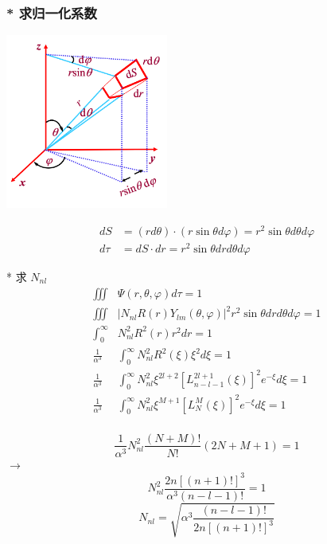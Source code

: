 \begin{frame}
	\frametitle{* 求归一化系数}
  \begin{center}
	   \includegraphics[width=0.4\textwidth]{figs/dt.png}
  \end{center}
$$ \begin{aligned}
  dS&=(rd\theta)\cdot (r\sin \theta d \varphi ) =r^2 \sin \theta d\theta d \varphi \\
  d \tau &=dS \cdot dr = r^2 \sin \theta dr d\theta d \varphi	  
\end{aligned}$$
\end{frame}

\begin{frame}
	* 求 $N_{nl}$ 
	\begin{equation*}
	\begin{split}
		\iiint  &\Psi(r,\theta,\varphi) d \tau =1  \\
		\iiint  &|N_{nl} R (r) Y_{lm} (\theta,\varphi)| ^2 r^2 \sin \theta dr d\theta d\varphi =1  \\
		\int_{0}^{\infty}  & N^2_{nl} R^2  (r)  r^2 dr =1   \\
		\frac{1}{\alpha ^3}	&\int_{0}^{\infty}  N^2_{nl}  R^2 (\xi)  \xi^2 d\xi =1   \\
		\frac{1}{\alpha ^3} &	\int_{0}^{\infty}  N^2_{nl}  \xi ^{2l+2}  [L_{n-l-1} ^{2l+1} (\xi)]^2 e^{-\xi}  d\xi =1   \\
		\frac{1}{\alpha ^3} &	\int_{0}^{\infty}  N^2_{nl}  \xi ^{M+1}  [L_N ^M (\xi)]^2 e^{-\xi}  d\xi =1   \\
	\end{split}		
	\end{equation*}	
\end{frame}		

\begin{frame}
	\begin{equation*}
		\frac{1}{\alpha ^3} 	  N^2_{nl}  \frac{(N+M)!}{N!} (2N+M+1) =1  	
	\end{equation*}	
	$\to$ \\
	\begin{equation*}
		N^2 _{nl}  \frac{2n [(n+1)!]^3} {\alpha^3 (n-l-1)!} =1
	\end{equation*}	
	\begin{equation*}
		N_{nl}  =\sqrt{\alpha^3 \frac{ (n-l-1)!}{2n [(n+1)!]^3}} 
	\end{equation*}	
\end{frame}		

